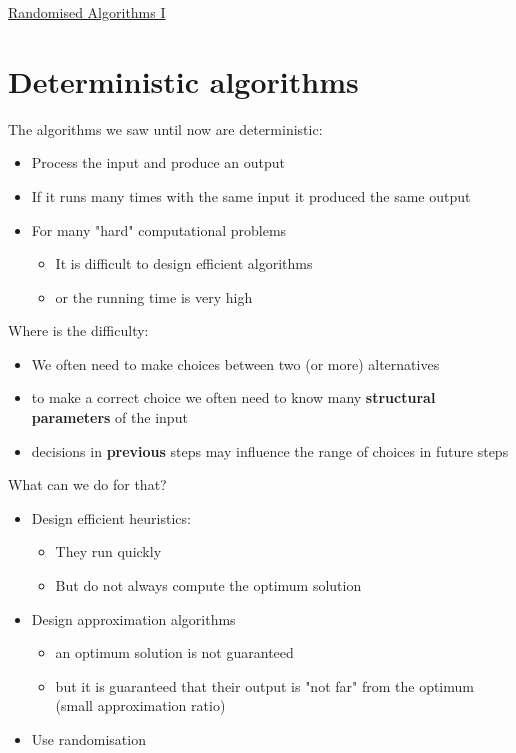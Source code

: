 \documentclass{article}[18pt]
\begin{document}
\begin{center}
\underline{\huge Randomised Algorithms I}
\end{center}
\section{Deterministic algorithms}
The algorithms we saw until now are deterministic:
\begin{itemize}
	\item Process the input and produce an output
	\item If it runs many times with the same input it produced the same output
	\item For many "hard" computational problems
	\begin{itemize}
		\item It is difficult to design efficient algorithms
		\item or the running time is very high
	\end{itemize}
\end{itemize}
Where is the difficulty:
\begin{itemize}
	\item We often need to make choices between two (or more) alternatives
	\item to make a correct choice we often need to know many \textbf{structural parameters} of the input
	\item decisions in \textbf{previous} steps may influence the range of choices in future steps
\end{itemize}
What can we do for that?
\begin{itemize}
	\item Design efficient heuristics:
	\begin{itemize}
		\item They run quickly
		\item But do not always compute the optimum solution
	\end{itemize}
	\item Design approximation algorithms
	\begin{itemize}
		\item an optimum solution is not guaranteed
		\item but it is guaranteed that their output is "not far" from the optimum (small approximation ratio)
	\end{itemize}
	\item Use randomisation
\end{itemize}
\end{document}
